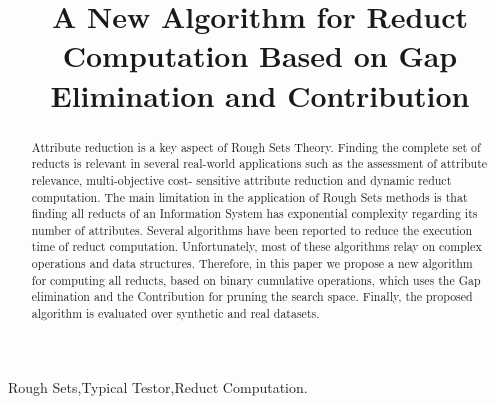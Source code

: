 \documentclass[authoryear,preprint,review,12pt]{elsarticle}
\begin{document}
	
	\title{A New Algorithm for Reduct Computation Based on Gap Elimination and Contribution}
		
	
	\address{Computer Science Department\\National Institute of
	Astrophysics, Optics and Electronics\\
	Luis Enrique Erro \# 1, Santa Mar\'{\i}a Tonantzintla, Puebla,
	72840, M\'{e}xico} 
	
	\begin{abstract}
		Attribute reduction is a key aspect of Rough Sets Theory.  Finding the complete set of reducts is relevant 
		in several real-world applications such as the assessment of attribute relevance, multi-objective cost-
		sensitive attribute reduction and dynamic reduct computation. The main limitation in the application of
		Rough Sets methods is that finding all reducts of an Information System has exponential complexity 
		regarding its number of attributes. Several algorithms have been reported to reduce the execution time
		of reduct computation. Unfortunately, most of these algorithms relay on complex operations and data
		structures. Therefore, in this paper we propose a new algorithm for computing all reducts, based on
		binary cumulative operations, which uses the Gap elimination and the Contribution for pruning the search
		space. Finally, the proposed algorithm is evaluated over synthetic and real datasets.
	\end{abstract}
	
	\begin{keyword}
		Rough Sets\sep Typical Testor\sep Reduct Computation.
	\end{keyword}

	\maketitle

\end{document}
